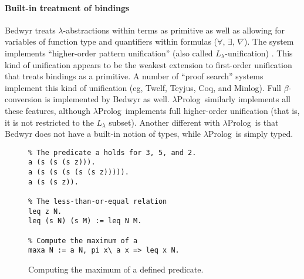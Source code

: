 \documentclass{article}
\newcommand{\lp}{$\lambda$Prolog}
\begin{document}
\paragraph{Built-in treatment of bindings}
Bedwyr treats $\lambda$-abstractions within terms as primitive as well
as allowing for variables of function type and quantifiers within
formulas ($\forall$, $\exists$, $\nabla$).  The system
implements ``higher-order pattern unification'' (also called
$L_\lambda$-unification) \cite{miller91jlc}.   This kind of unification
appears to be the weakest extension to first-order unification that
treats bindings as a primitive.  A number of ``proof search'' systems
implement this kind of unification (eg, Twelf, Teyjus, Coq, and
Minlog).  Full $\beta$-conversion is implemented by Bedwyr as well.
\lp\ similarly implements all these features, although \lp\ implements
full higher-order unification (that is, it is not restricted to the
$L_\lambda$ subset).  Another different with \lp\ is that Bedwyr does
not have a built-in notion of types, while \lp\ is simply typed.

\begin{figure}
\begin{verbatim}
% The predicate a holds for 3, 5, and 2.
a (s (s (s z))).
a (s (s (s (s (s z))))).
a (s (s z)).

% The less-than-or-equal relation
leq z N.
leq (s N) (s M) := leq N M.

% Compute the maximum of a
maxa N := a N, pi x\ a x => leq x N.
\end{verbatim}
\caption{Computing the maximum of a defined predicate.}
\label{maxa}
\end{figure}
\end{document}
